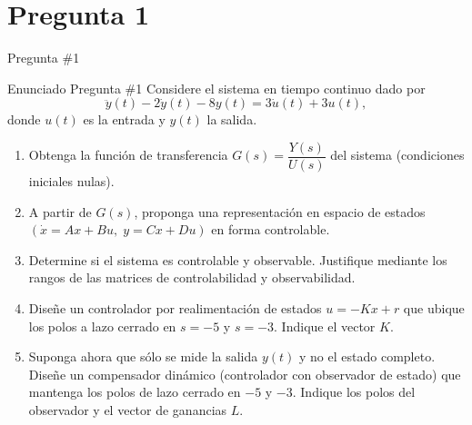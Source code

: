 \documentclass[
    10pt,
    aspectratio=169,
    xcolor={dvipsnames},
    spanish,
    ]{beamer}
\begin{document}
\section{Pregunta 1}
\begin{frame}{Pregunta \#1}
  \footnotesize
\begin{block}{Enunciado Pregunta \#1}
 Considere el sistema en tiempo continuo dado por
  \begin{equation}
      \ddot y(t) - 2\dot y(t) - 8 y(t) = 3\dot u(t) + 3 u(t),
      \label{eq:plant}
  \end{equation}
  donde $u(t)$ es la entrada y $y(t)$ la salida.

  \begin{enumerate}
    \item Obtenga la función de transferencia $G(s)=\dfrac{Y(s)}{U(s)}$ del sistema (condiciones iniciales nulas).
    \item A partir de $G(s)$, proponga una representación en espacio de estados $(\dot x = Ax + Bu,\; y = Cx + Du)$ en forma controlable.
    \item Determine si el sistema es controlable y observable. Justifique mediante los rangos de las matrices de controlabilidad y observabilidad.
    \item Diseñe un controlador por realimentación de estados $u = -Kx + r$ que ubique los polos a lazo cerrado en $s=-5$ y $s=-3$. Indique el vector $K$.
    \item Suponga ahora que sólo se mide la salida $y(t)$ y no el estado completo. Diseñe un compensador dinámico (controlador con observador de estado) que mantenga los polos de lazo cerrado en $-5$ y $-3$. Indique los polos del observador y el vector de ganancias $L$.
  \end{enumerate}
\end{block}
\end{frame}
\end{document}
